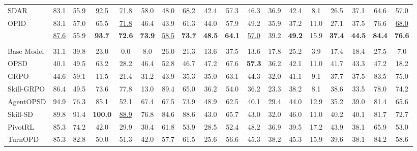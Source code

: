 \documentclass[10pt, logo, onecolumn, copyright]{nv}
\begin{document}
\begin{table}[t]
{\begin{tabular}{l@{\hspace{7pt}} ccccccc cccccccc cc}
SDAR
 & 83.1 & 55.9 & \cellcolor{cellsecond}\underline{92.5} & \cellcolor{cellsecond}\underline{71.8} & 58.0 & 48.0 & \cellcolor{cellsecond}\underline{68.2} & 42.4 & 57.3 & 46.3 & 36.9 & 42.4 & 8.1 & 26.5 & 37.1 & 64.6 & 57.0 \\
OPID
 & 83.1 & 57.0 & 65.5 & \cellcolor{cellsecond}\underline{71.8} & 46.4 & 43.9 & 61.3 & 44.0 & 57.9 & 49.2 & 35.9 & 37.2 & 11.0 & 27.1 & 37.5 & 76.6 & \cellcolor{cellsecond}\underline{68.0} \\
\textbf{\method{}}
 & \cellcolor{cellsecond}\underline{87.6} & 55.9 & \cellcolor{cellbest}\textbf{93.7} & \cellcolor{cellbest}\textbf{72.6} & \cellcolor{cellbest}\textbf{73.9} & \cellcolor{cellsecond}\underline{58.5} & \cellcolor{cellbest}\textbf{73.7} & \cellcolor{cellbest}\textbf{48.5} & \cellcolor{cellbest}\textbf{64.1} & \cellcolor{cellsecond}\underline{57.0} & 39.2 & \cellcolor{cellbest}\textbf{49.2} & 15.9 & \cellcolor{cellbest}\textbf{37.4} & \cellcolor{cellbest}\textbf{44.5} & \cellcolor{cellbest}\textbf{84.4} & \cellcolor{cellbest}\textbf{76.6} \\
\midrule
\rowcolor{gray!15}\multicolumn{18}{l}{\textit{Qwen3-8B}} \\
Base Model
 & 31.1 & 39.8 & 23.0 & 0.0 & 8.0 & 26.0 & 21.3 & 13.6 & 37.5 & 13.6 & 17.8 & 25.2 & 3.9 & 17.4 & 18.4 & 27.5 & 7.0 \\
OPSD
 & 40.1 & 49.5 & 63.2 & 28.2 & 46.4 & 52.8 & 46.7 & 47.2 & 67.6 & \cellcolor{cellbest}\textbf{57.3} & 36.2 & 42.1 & 11.0 & 41.7 & 43.3 & 47.2 & 18.2 \\
GRPO
 & 44.6 & 59.1 & 11.5 & 21.4 & 31.2 & 43.9 & 35.3 & 35.0 & 63.1 & 44.3 & 32.0 & 41.1 & 9.1 & 37.7 & 37.5 & 83.5 & 75.0 \\
Skill-GRPO
 & 86.4 & 49.5 & 73.6 & 77.8 & 13.0 & 89.4 & 65.0 & 36.2 & 54.0 & 36.2 & 23.3 & 38.2 & 8.1 & 38.6 & 33.5 & 78.0 & 74.2 \\
AgentOPSD
 & 94.9 & 76.3 & 85.1 & 52.1 & 67.4 & 67.5 & 73.9 & 48.9 & 62.5 & 40.1 & 29.4 & 44.0 & 12.9 & 35.2 & 39.0 & 81.4 & 65.6 \\
Skill-SD
 & 89.8 & 91.4 & \cellcolor{cellbest}\textbf{100.0} & \cellcolor{cellsecond}\underline{88.9} & 76.8 & 84.6 & 88.6 & 43.0 & 65.7 & 43.0 & 32.0 & 46.0 & 11.0 & 40.2 & 40.1 & 81.7 & 72.7 \\
PivotRL
 & 85.3 & 74.2 & 42.0 & 29.9 & 30.4 & 61.8 & 53.9 & 28.5 & 52.4 & 48.2 & 36.9 & 39.5 & 17.2 & 43.9 & 38.1 & 65.9 & 53.0 \\
TurnOPD
 & 85.3 & 82.8 & 50.0 & 51.3 & 42.0 & 57.7 & 61.5 & 25.6 & 56.6 & 45.3 & 38.2 & 45.3 & 15.9 & 39.6 & 38.1 & 84.2 & 58.6 \\

\end{tabular}}
\end{table}
\end{document}
